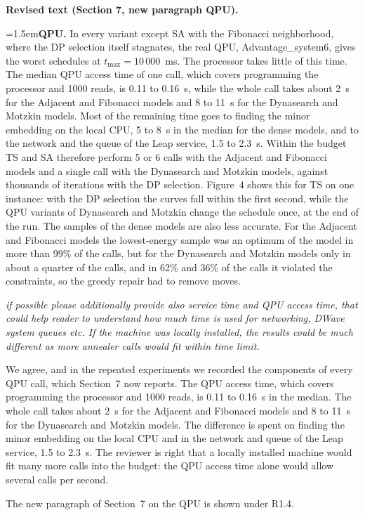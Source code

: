 \documentclass[12pt]{article}
\newenvironment{rc}[1]{\par\medskip\noindent\itshape\renewcommand{\emph}[1]{\textbf{##1}}\ignorespaces}{\par}
\newcommand{\answer}[1]{\par\smallskip\noindent #1\par}
\newcommand{\change}[3]{\par\smallskip\noindent\textbf{Revised text (#1).}\par
  {\leftskip=1.5em\noindent#3\par}}
\begin{document}
\change{Section 7, new paragraph QPU}{\textit{(no counterpart in the original manuscript)}}{\textbf{QPU.} In every variant except SA with the Fibonacci neighborhood, where the DP selection itself stagnates, the real QPU, Advantage\_system6, gives the worst schedules at $t_{\max}=10\,000$~ms. The processor takes little of this time. The median QPU access time of one call, which covers programming the processor and 1000 reads, is 0.11 to 0.16~s, while the whole call takes about 2~s for the Adjacent and Fibonacci models and 8 to 11~s for the Dynasearch and Motzkin models. Most of the remaining time goes to finding the minor embedding on the local CPU, 5 to 8~s in the median for the dense models, and to the network and the queue of the Leap service, 1.5 to 2.3~s. Within the budget TS and SA therefore perform 5 or 6 calls with the Adjacent and Fibonacci models and a single call with the Dynasearch and Motzkin models, against thousands of iterations with the DP selection. Figure~4 shows this for TS on one instance: with the DP selection the curves fall within the first second, while the QPU variants of Dynasearch and Motzkin change the schedule once, at the end of the run. The samples of the dense models are also less accurate. For the Adjacent and Fibonacci models the lowest-energy sample was an optimum of the model in more than 99\% of the calls, but for the Dynasearch and Motzkin models only in about a quarter of the calls, and in 62\% and 36\% of the calls it violated the constraints, so the greedy repair had to remove moves.}

\begin{rc}{R1.5 --- Service time and QPU access time}
if possible please additionally provide also service time and QPU access time, that could help reader to understand how much time is used for networking, DWave system queues etc. If the machine was locally installed, the results could be much different as more annealer calls would fit within time limit.
\end{rc}
\answer{We agree, and in the repeated experiments we recorded the components of every QPU call, which Section~7 now reports. The QPU access time, which covers programming the processor and 1000 reads, is 0.11 to 0.16~s in the median. The whole call takes about 2~s for the Adjacent and Fibonacci models and 8 to 11~s for the Dynasearch and Motzkin models. The difference is spent on finding the minor embedding on the local CPU and in the network and queue of the Leap service, 1.5 to 2.3~s. The reviewer is right that a locally installed machine would fit many more calls into the budget: the QPU access time alone would allow several calls per second.}
The new paragraph of Section~7 on the QPU is shown under R1.4.
\end{document}
